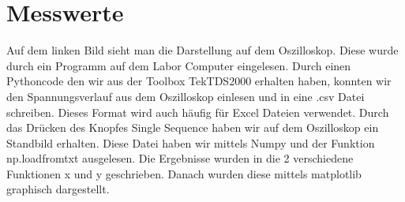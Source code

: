 \documentclass[12pt, oneside, a4paper, \docLanguage]{report}
\begin{document}
\section{Messwerte}
\label{chap:VERSUCH_1_MESSWERTE}
Auf dem linken Bild sieht man die Darstellung auf dem Oszilloskop. Diese wurde durch ein Programm auf dem Labor Computer eingelesen.
Durch einen Pythoncode den wir aus der Toolbox TekTDS2000 erhalten haben, konnten wir den Spannungsverlauf aus dem Oszilloskop einlesen und in eine .csv Datei schreiben. Dieses Format wird auch häufig für Excel Dateien verwendet.
Durch das Drücken des Knopfes Single Sequence haben wir auf dem Oszilloskop ein Standbild erhalten.
Diese Datei haben wir mittels Numpy und der Funktion np.loadfromtxt ausgelesen.
Die Ergebnisse wurden in die 2 verschiedene Funktionen x und y geschrieben.
Danach wurden diese mittels matplotlib graphisch dargestellt.
\end{document}
